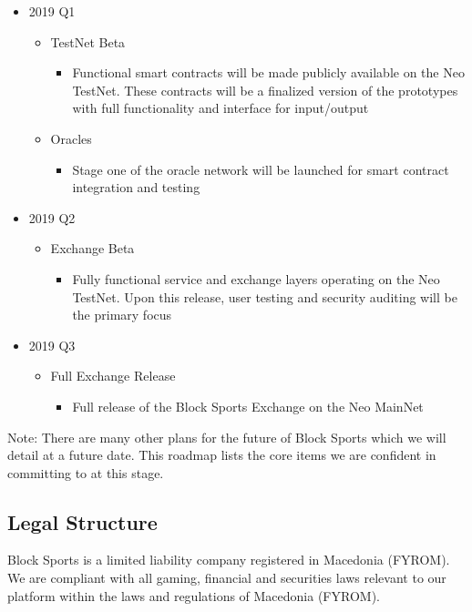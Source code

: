 \documentclass{article}
\begin{document}
\begin{itemize}
   \item 2019 Q1
   \begin{itemize}
     \item TestNet Beta
     	\begin{itemize}
     		\item Functional smart contracts will be made publicly available on the Neo TestNet. These contracts will be a finalized version of the prototypes with full functionality and interface for input/output
     	\end{itemize}
     \item Oracles
     	\begin{itemize}
     		\item Stage one of the oracle network will be launched for smart contract integration and testing
     	\end{itemize}
   \end{itemize}

    \item 2019 Q2
   \begin{itemize}
     \item Exchange Beta
     	\begin{itemize}
     		\item Fully functional service and exchange layers operating on the Neo TestNet. Upon this release, user testing and security auditing will be the primary focus
     	\end{itemize}
   \end{itemize}

   \item 2019 Q3
   \begin{itemize}
     \item Full Exchange Release
     	\begin{itemize}
     		\item Full release of the Block Sports Exchange on the Neo MainNet
     	\end{itemize}
   \end{itemize}

\end{itemize}

Note: There are many other plans for the future of Block Sports which we will detail at a future date. This roadmap lists the core items we are confident in committing to at this stage.

	\subsection{Legal Structure}
Block Sports is a limited liability company registered in Macedonia (FYROM). We are compliant with all gaming, financial and securities laws relevant to our platform within the laws and regulations of Macedonia (FYROM).
\end{document}
